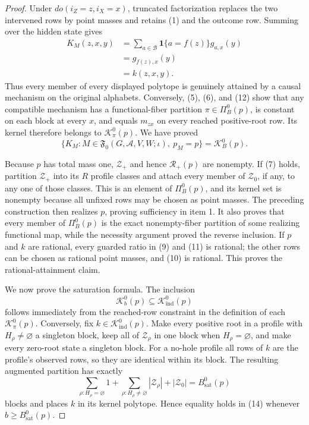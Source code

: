\documentclass{article}
\begin{document}
\begin{proof}
Under \(do(i_Z=z,i_X=x)\), truncated factorization replaces the two
intervened rows by point masses and retains (1) and the outcome row.
Summing over the hidden state gives
\[
\begin{aligned}
 K_M(z,x,y)
 &=\sum_{a\in\mathcal B}
   \mathbf 1\{a=f(z)\}g_{a,x}(y)\\
 &=g_{f(z),x}(y)\\
 &=k(z,x,y).
\end{aligned}
\tag{12}
\]
Thus every member of every displayed polytope is genuinely attained by a
causal mechanism on the original alphabets.  Conversely, (5), (6), and
(12) show that any compatible mechanism has a functional-fiber partition
\(\pi\in\Pi_B^0(p)\), is constant on each block at every \(x\), and
equals \(m_{zx}\) on every reached positive-root row.  Its kernel
therefore belongs to \(\mathcal K_\pi^0(p)\).  We have proved
\[
 \{K_M:M\in\mathfrak F_0(G,\mathcal A,V,W;\iota),\ p_M=p\}
 =\mathcal K_B^0(p).
\tag{13}
\]

Because \(p\) has total mass one, \(\mathcal Z_+\) and hence
\(\mathcal R_+(p)\) are nonempty.  If (7) holds, partition
\(\mathcal Z_+\) into its \(R\) profile classes and attach every member
of \(\mathcal Z_0\), if any, to any one of those classes.  This is an
element of \(\Pi_B^0(p)\), and its kernel set is nonempty because all
unfixed rows may be chosen as point masses.  The preceding construction
then realizes \(p\), proving sufficiency in item 1.  It also proves that
every member of \(\Pi_B^0(p)\) is the exact nonempty-fiber partition of
some realizing functional map, while the necessity argument proved the
reverse inclusion.  If \(p\) and \(k\) are rational, every guarded ratio
in (9) and (11) is rational; the other rows can be chosen as rational
point masses, and (10) is rational.  This proves the rational-attainment
claim.

We now prove the saturation formula.  The inclusion
\[
 \mathcal K_b^0(p)\subseteq\mathcal K_{\mathrm{ind}}^0(p)
\tag{14}
\]
follows immediately from the reached-row constraint in the definition of
each \(\mathcal K_\pi^0(p)\).  Conversely, fix
\(k\in\mathcal K_{\mathrm{ind}}^0(p)\).  Make every positive root in a
profile with \(H_\rho\ne\varnothing\) a singleton block, keep all of
\(\mathcal Z_\rho\) in one block when \(H_\rho=\varnothing\), and make
every zero-root state a singleton block.  For a no-hole profile all rows
of \(k\) are the profile's observed rows, so they are identical within
its block.  The resulting augmented partition has exactly
\[
 \sum_{\rho:H_\rho=\varnothing}1
 +\sum_{\rho:H_\rho\ne\varnothing}|\mathcal Z_\rho|
 +|\mathcal Z_0|
 =B_{\mathrm{sat}}^0(p)
\tag{15}
\]
blocks and places \(k\) in its kernel polytope.  Hence equality holds in
(14) whenever \(b\geq B_{\mathrm{sat}}^0(p)\).


\end{proof}
\end{document}
